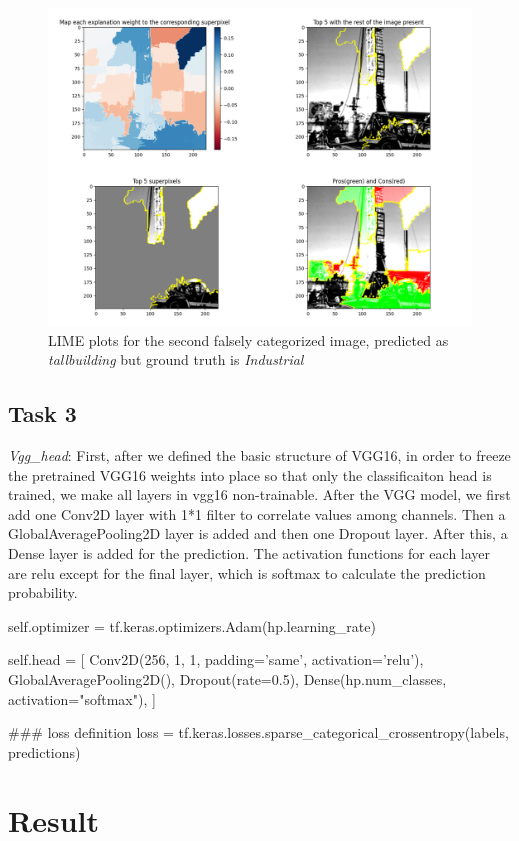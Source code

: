 \begin{figure}[htbp]
    \centering
    \includegraphics[width=0.85\linewidth]{Lime_2.png}
    \caption{LIME plots for the second falsely categorized image, predicted as \emph{tallbuilding} but ground truth is \emph{Industrial}}
    \label{fig:LIME_2}
\end{figure}

\subsection*{Task 3}

\emph{Vgg\_head}: First, after we defined the basic structure of VGG16, in order to freeze the pretrained VGG16 weights into place so that only the classificaiton head is trained, we make all layers in vgg16 non-trainable. After the VGG model, we first add one Conv2D layer with 1*1 filter to correlate values among channels. Then a GlobalAveragePooling2D layer is added and then one Dropout layer. After this, a Dense layer is added for the prediction. The activation functions for each layer are relu except for the final layer, which is softmax to calculate the prediction probability.
    \begin{python}
self.optimizer = tf.keras.optimizers.Adam(hp.learning_rate)

self.head = [
    Conv2D(256, 1, 1, padding='same', activation='relu'),
    GlobalAveragePooling2D(),
    Dropout(rate=0.5),
    Dense(hp.num_classes, activation="softmax"),
  ]
  
### loss definition
loss = tf.keras.losses.sparse_categorical_crossentropy(labels, predictions)
    \end{python}

\section*{Result}

